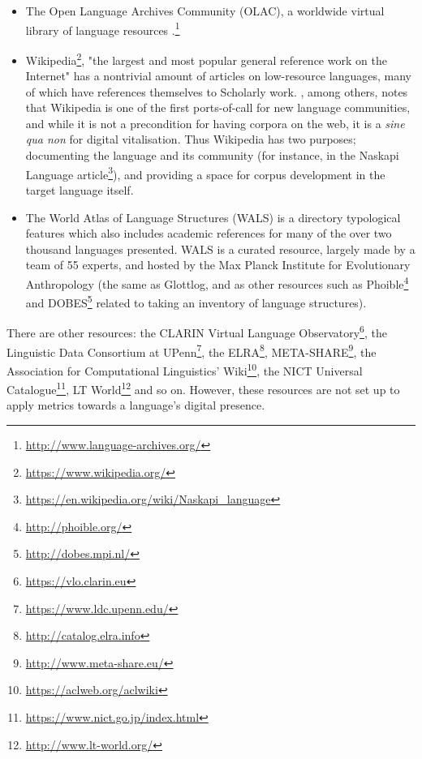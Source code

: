 \begin{itemize}
\item The Open Language Archives Community (OLAC), a worldwide virtual library of language resources \citep{simons2003open}.\footnote{\href{http://www.language-archives.org/}{http://www.language-archives.org/}}

\item Wikipedia\footnote{\href{https://www.wikipedia.org/}{https://www.wikipedia.org/}}, "the largest and most popular general reference work on the Internet" \citep{wiki:Wikipedia} has a nontrivial amount of articles on low-resource languages, many of which have references themselves to Scholarly work. \citep{kornai2013digital}, among others, notes that Wikipedia is one of the first ports-of-call for new language communities, and while it is not a precondition for having corpora on the web, it is a {\it sine qua non} for digital vitalisation. Thus Wikipedia has two purposes; documenting the language and its community (for instance, in the Naskapi Language article\footnote{\href{https://en.wikipedia.org/wiki/Naskapi\_language}{https://en.wikipedia.org/wiki/Naskapi\_language}}), and providing a space for corpus development in the target language itself.

\item The World Atlas of Language Structures (WALS) is a directory typological features which also includes academic references for many of the over two thousand languages presented. WALS is a curated resource, largely made by a team of 55 experts, and hosted by the Max Planck Institute for Evolutionary Anthropology (the same as Glottlog, and as other resources such as Phoible\footnote{\href{http://phoible.org/}{http://phoible.org/}} \citep{phoible} and DOBES\footnote{\href{http://dobes.mpi.nl/}{http://dobes.mpi.nl/}} \citep{wittenburg2003dobes} related to taking an inventory of language structures). \citep{wals}



\end{itemize}

There are other resources: the CLARIN Virtual Language Observatory\footnote{\href{https://vlo.clarin.eu}{https://vlo.clarin.eu}}, the Linguistic Data Consortium at UPenn\footnote{\href{https://www.ldc.upenn.edu/}{https://www.ldc.upenn.edu/}}, the ELRA\footnote{\href{http://catalog.elra.info}{http://catalog.elra.info}}, META-SHARE\footnote{\href{http://www.meta-share.eu/}{http://www.meta-share.eu/}}, the Association for Computational Linguistics' Wiki\footnote{\href{https://aclweb.org/aclwiki}{https://aclweb.org/aclwiki}}, the NICT Universal Catalogue\footnote{\href{https://www.nict.go.jp/index.html}{https://www.nict.go.jp/index.html}}, LT World\footnote{\href{http://www.lt-world.org/}{http://www.lt-world.org/}} and so on. However, these resources are not set up to apply metrics towards a language's digital presence.

